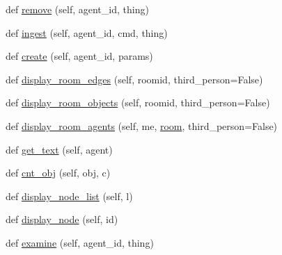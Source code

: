 \begin{DoxyCompactItemize}
\item 
def \hyperlink{classprojects_1_1mastering__the__dungeon_1_1tasks_1_1graph__world2_1_1graph_1_1Graph_a0d81485443eb223640c8bd5bc158ae32}{remove} (self, agent\+\_\+id, thing)
\item 
def \hyperlink{classprojects_1_1mastering__the__dungeon_1_1tasks_1_1graph__world2_1_1graph_1_1Graph_a118d4ed2c9eb72184ed3940f6173bc04}{ingest} (self, agent\+\_\+id, cmd, thing)
\item 
def \hyperlink{classprojects_1_1mastering__the__dungeon_1_1tasks_1_1graph__world2_1_1graph_1_1Graph_a36bfab4fc9fb5cb54e4698175b1565b0}{create} (self, agent\+\_\+id, params)
\item 
def \hyperlink{classprojects_1_1mastering__the__dungeon_1_1tasks_1_1graph__world2_1_1graph_1_1Graph_a0e754e04d1c69f6531f0f7e18ba7f35a}{display\+\_\+room\+\_\+edges} (self, roomid, third\+\_\+person=False)
\item 
def \hyperlink{classprojects_1_1mastering__the__dungeon_1_1tasks_1_1graph__world2_1_1graph_1_1Graph_a466a066fe10c50b36b6290e271e3f299}{display\+\_\+room\+\_\+objects} (self, roomid, third\+\_\+person=False)
\item 
def \hyperlink{classprojects_1_1mastering__the__dungeon_1_1tasks_1_1graph__world2_1_1graph_1_1Graph_a53875bd0094c23c7f852f2320a6a8b25}{display\+\_\+room\+\_\+agents} (self, me, \hyperlink{classprojects_1_1mastering__the__dungeon_1_1tasks_1_1graph__world2_1_1graph_1_1Graph_a7d58b9a688d3a775f150c7a40a72c11d}{room}, third\+\_\+person=False)
\item 
def \hyperlink{classprojects_1_1mastering__the__dungeon_1_1tasks_1_1graph__world2_1_1graph_1_1Graph_af732db53ab81a30152d5c4ed8bbdef41}{get\+\_\+text} (self, agent)
\item 
def \hyperlink{classprojects_1_1mastering__the__dungeon_1_1tasks_1_1graph__world2_1_1graph_1_1Graph_ac230ca7418811a6c9c4d9880c4d6334f}{cnt\+\_\+obj} (self, obj, c)
\item 
def \hyperlink{classprojects_1_1mastering__the__dungeon_1_1tasks_1_1graph__world2_1_1graph_1_1Graph_ad4765421393cb14a6084a9d98dd530a0}{display\+\_\+node\+\_\+list} (self, l)
\item 
def \hyperlink{classprojects_1_1mastering__the__dungeon_1_1tasks_1_1graph__world2_1_1graph_1_1Graph_a22e60e26302aae3e1c0d43f86f4c332d}{display\+\_\+node} (self, id)
\item 
def \hyperlink{classprojects_1_1mastering__the__dungeon_1_1tasks_1_1graph__world2_1_1graph_1_1Graph_a7976e6ef1b45caf0e61d3d11a1ff6c1d}{examine} (self, agent\+\_\+id, thing)

\end{DoxyCompactItemize}
